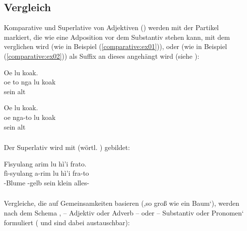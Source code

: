 \subsection{Vergleich} Komparative und Superlative von Adjektiven () werden mit der Partikel  markiert, die wie eine Adposition vor dem Substantiv stehen kann, mit dem verglichen wird (wie in Beispiel (\ref{comparative:ex01})), oder (wie in Beispiel (\ref{comparative:ex02})) als Suffix an dieses angehängt wird (siehe ):

\begin{interlin} \label{comparative:ex01}
	\glll Oe   lu koak. \\
	oe to nga lu koak \\
	   sein alt \\
\end{interlin}

\begin{interlin} \label{comparative:ex02}
	\glll Oe  lu koak. \\
	oe nga-to lu koak \\
	  sein alt \\
\end{interlin}

\subsubsection{} Der Superlativ wird mit   (wörtl. ) gebildet: 

\begin{interlin}
	\glll \Npawl{}Fìsyulang arim lu hì'i frato. \\
	fì-syulang a-rim lu hì'i fra-to \\
	-Blume -gelb sein klein alles- \\
\end{interlin}

\subsubsection{} Vergleiche, die auf Gemeinsamkeiten basieren (,so groß wie ein Baum‘), werden nach dem Schema , -- Adjektiv oder Adverb --  oder  -- Substantiv oder Pronomen‘ formuliert ( und  sind dabei austauschbar):

